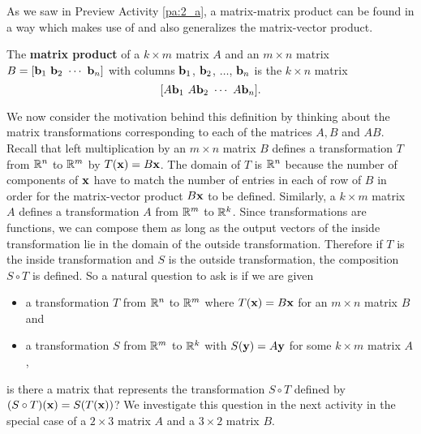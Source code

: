 
As we saw in Preview Activity \ref{pa:2_a}, a matrix-matrix product can be found in a way which makes use of and also generalizes the matrix-vector product.



\begin{definition} The \textbf{matrix product} of a $k \times m$ matrix $A$ and an $m \times n$ matrix $B = [\vb_1 \ \vb_2 \ \cdots \ \vb_n]$ with columns $\mathbf{b}_1$, $\mathbf{b}_2$, $\ldots$, $\mathbf{b}_n$ is the $k \times n$ matrix
\[[A\vb_1 \ A\vb_2 \ \cdots \ A\vb_n].\]
\end{definition}



We now consider the motivation behind this definition by thinking about the matrix transformations corresponding to each of the matrices $A, B$ and $AB$.
Recall that left multiplication by an $m \times n$ matrix $B$ defines a transformation $T$ from $\mathbb{R}^n$ to $\mathbb{R}^m$ by $T(\mathbf{x})=B\mathbf{x}$. The domain of $T$ is $\mathbb{R}^n$ because the number of components of $\mathbf{x}$ have to match the number of entries in each of row of $B$ in order for the matrix-vector product $B\mathbf{x}$ to be defined. Similarly, a $k \times m$ matrix $A$ defines a transformation $A$ from $\mathbb{R}^m$ to $\mathbb{R}^k$. Since transformations are functions, we can compose them as long as the output vectors of the inside transformation lie in the domain of the outside transformation. Therefore if $T$ is the inside transformation and $S$ is the outside transformation, the composition $S\circ T$ is defined. So a natural question to ask is if we are given
\begin{itemize}
\item a transformation $T$ from $\mathbb{R}^n$ to $\mathbb{R}^m$ where $T(\mathbf{x}) = B \mathbf{x}$ for an $m \times n$ matrix $B$ and
\item a transformation $S$ from $\mathbb{R}^m$ to $\mathbb{R}^k$ with $S(\mathbf{y}) = A \mathbf{y}$ for some $k \times m$ matrix $A$,
\end{itemize}
is there a matrix that represents the transformation $S \circ T$ defined by $(S\circ T)(\mathbf{x})=S(T(\mathbf{x}))$? We investigate this question in the next activity in the special case of a $2\times 3$ matrix $A$ and a $3\times 2$ matrix $B$.

